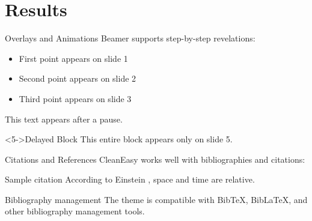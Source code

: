 \documentclass[aspectratio=169,xcolor=dvipsnames]{beamer}
\begin{document}
\section{Results}
\begin{frame}{Overlays and Animations}
  Beamer supports step-by-step revelations:
  
  \begin{itemize}
    \item<1-> First point appears on slide 1
    \item<2-> Second point appears on slide 2
    \item<3-> Third point appears on slide 3
  \end{itemize}
  
  \pause
  
  This text appears after a pause.
  
  
  \begin{block}<5->{Delayed Block}
    This entire block appears only on slide 5.
  \end{block}
\end{frame}

\begin{frame}{Citations and References}
  CleanEasy works well with bibliographies and citations:
  
  \begin{block}{Sample citation}
    According to Einstein \cite{einstein1905}, space and time are relative.
  \end{block}
  
  \begin{exampleblock}{Bibliography management}
    The theme is compatible with BibTeX, BibLaTeX, and other bibliography management tools.
  \end{exampleblock}
  
\end{frame}
\end{document}
